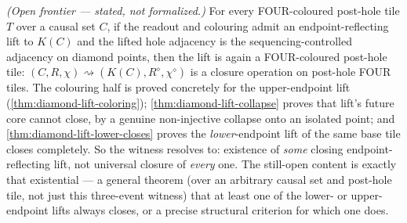 \begin{theorem}\label{thm:diamond-lift-closure-conjecture}\notready{}
\emph{(Open frontier --- stated, not formalized.)} For every FOUR-coloured post-hole tile $T$ over
a causal set $C$, if the readout and colouring admit an endpoint-reflecting lift to $K(C)$ and the
lifted hole adjacency is the sequencing-controlled adjacency on diamond points, then the lift is
again a FOUR-coloured post-hole tile: $(C, R, \chi) \rightsquigarrow (K(C), R^\diamond, \chi^\diamond)$
is a closure operation on post-hole FOUR tiles. The colouring half is proved concretely for the
upper-endpoint lift (\cref{thm:diamond-lift-coloring}); \cref{thm:diamond-lift-collapse} proves that
lift's future core cannot close, by a genuine non-injective collapse onto an isolated point; and
\cref{thm:diamond-lift-lower-closes} proves the \emph{lower}-endpoint lift of the same base tile
closes completely. So the witness resolves to: existence of \emph{some} closing endpoint-reflecting
lift, not universal closure of \emph{every} one. The still-open content is exactly that existential
--- a general theorem (over an arbitrary causal set and post-hole tile, not just this three-event
witness) that at least one of the lower- or upper-endpoint lifts always closes, or a precise
structural criterion for which one does.
\end{theorem}
